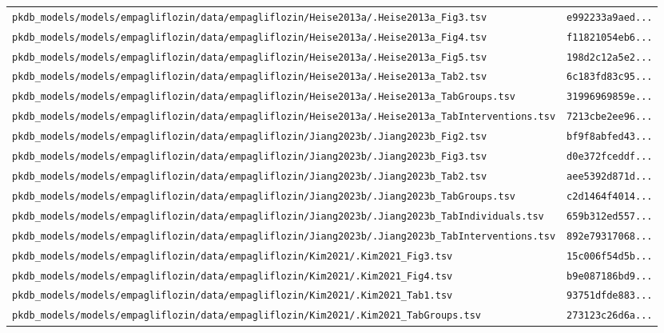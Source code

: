 \documentclass{article}
\begin{document}
\begin{longtable}{ll}
\texttt{pkdb\_models/models/empagliflozin/data/empagliflozin/Heise2013a/.Heise2013a\_Fig3.tsv} & \texttt{e992233a9aed...} \\
\texttt{pkdb\_models/models/empagliflozin/data/empagliflozin/Heise2013a/.Heise2013a\_Fig4.tsv} & \texttt{f11821054eb6...} \\
\texttt{pkdb\_models/models/empagliflozin/data/empagliflozin/Heise2013a/.Heise2013a\_Fig5.tsv} & \texttt{198d2c12a5e2...} \\
\texttt{pkdb\_models/models/empagliflozin/data/empagliflozin/Heise2013a/.Heise2013a\_Tab2.tsv} & \texttt{6c183fd83c95...} \\
\texttt{pkdb\_models/models/empagliflozin/data/empagliflozin/Heise2013a/.Heise2013a\_TabGroups.tsv} & \texttt{31996969859e...} \\
\texttt{pkdb\_models/models/empagliflozin/data/empagliflozin/Heise2013a/.Heise2013a\_TabInterventions.tsv} & \texttt{7213cbe2ee96...} \\
\texttt{pkdb\_models/models/empagliflozin/data/empagliflozin/Jiang2023b/.Jiang2023b\_Fig2.tsv} & \texttt{bf9f8abfed43...} \\
\texttt{pkdb\_models/models/empagliflozin/data/empagliflozin/Jiang2023b/.Jiang2023b\_Fig3.tsv} & \texttt{d0e372fceddf...} \\
\texttt{pkdb\_models/models/empagliflozin/data/empagliflozin/Jiang2023b/.Jiang2023b\_Tab2.tsv} & \texttt{aee5392d871d...} \\
\texttt{pkdb\_models/models/empagliflozin/data/empagliflozin/Jiang2023b/.Jiang2023b\_TabGroups.tsv} & \texttt{c2d1464f4014...} \\
\texttt{pkdb\_models/models/empagliflozin/data/empagliflozin/Jiang2023b/.Jiang2023b\_TabIndividuals.tsv} & \texttt{659b312ed557...} \\
\texttt{pkdb\_models/models/empagliflozin/data/empagliflozin/Jiang2023b/.Jiang2023b\_TabInterventions.tsv} & \texttt{892e79317068...} \\
\texttt{pkdb\_models/models/empagliflozin/data/empagliflozin/Kim2021/.Kim2021\_Fig3.tsv} & \texttt{15c006f54d5b...} \\
\texttt{pkdb\_models/models/empagliflozin/data/empagliflozin/Kim2021/.Kim2021\_Fig4.tsv} & \texttt{b9e087186bd9...} \\
\texttt{pkdb\_models/models/empagliflozin/data/empagliflozin/Kim2021/.Kim2021\_Tab1.tsv} & \texttt{93751dfde883...} \\
\texttt{pkdb\_models/models/empagliflozin/data/empagliflozin/Kim2021/.Kim2021\_TabGroups.tsv} & \texttt{273123c26d6a...} \\

\end{longtable}
\end{document}
